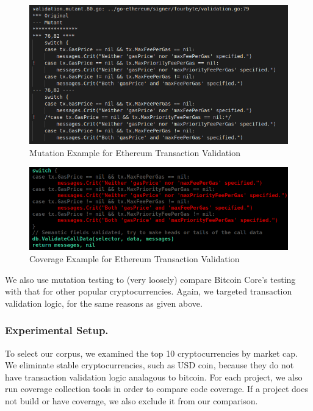 \begin{figure}
\vspace{2mm}
\includegraphics[width=0.9\columnwidth]{mutation-example.png}
\caption{Mutation Example for Ethereum Transaction Validation}
\label{fig:mutation}
\end{figure}

\begin{figure}
\vspace{2mm}
\includegraphics[width=0.9\columnwidth]{coverage-example.png}
\caption{Coverage Example for Ethereum Transaction Validation}
\label{fig:coverage}
\end{figure}

We also use mutation testing to (very loosely) compare Bitcoin Core's testing
with that for other popular cryptocurrencies. Again, we targeted
transaction validation logic, for the same reasons as given above.

\subsubsection*{Experimental Setup.} To select
our corpus, we examined the top 10 cryptocurrencies by market cap. We eliminate stable cryptocurrencies, such as USD coin,
because they do not have transaction validation logic analagous to bitcoin. For each project, we also run coverage collection
tools in order to compare code coverage. If a project does not build or have coverage, we also exclude it from our comparison.

